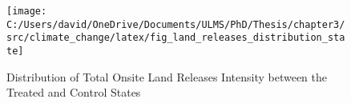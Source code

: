 \begin{figure}[H]
    \centering
    \texttt{[image: C:/Users/david/OneDrive/Documents/ULMS/PhD/Thesis/chapter3/src/climate\_change/latex/fig\_land\_releases\_distribution\_state]}
    \caption{Distribution of Total Onsite Land Releases Intensity between the Treated and Control States}
    \label{fig:land-releases-distribution}
\end{figure}